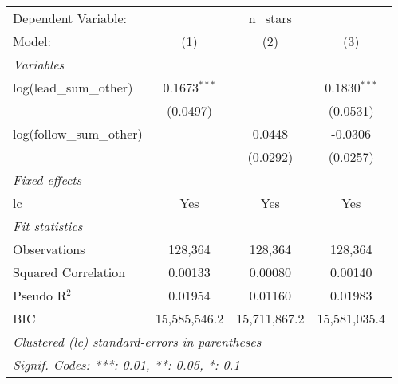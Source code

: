 
\begingroup
\centering
\begin{tabular}{lccc}
   \tabularnewline \midrule \midrule
   Dependent Variable: & \multicolumn{3}{c}{n\_stars}\\
   Model:                    & (1)            & (2)          & (3)\\  
   \midrule
   \emph{Variables}\\
   log(lead\_sum\_other)     & 0.1673$^{***}$ &              & 0.1830$^{***}$\\   
                             & (0.0497)       &              & (0.0531)\\   
   log(follow\_sum\_other)   &                & 0.0448       & -0.0306\\   
                             &                & (0.0292)     & (0.0257)\\   
   \midrule
   \emph{Fixed-effects}\\
   lc                        & Yes            & Yes          & Yes\\  
   \midrule
   \emph{Fit statistics}\\
   Observations              & 128,364        & 128,364      & 128,364\\  
   Squared Correlation       & 0.00133        & 0.00080      & 0.00140\\  
   Pseudo R$^2$              & 0.01954        & 0.01160      & 0.01983\\  
   BIC                       & 15,585,546.2   & 15,711,867.2 & 15,581,035.4\\  
   \midrule \midrule
   \multicolumn{4}{l}{\emph{Clustered (lc) standard-errors in parentheses}}\\
   \multicolumn{4}{l}{\emph{Signif. Codes: ***: 0.01, **: 0.05, *: 0.1}}\\
\end{tabular}
\par\endgroup


